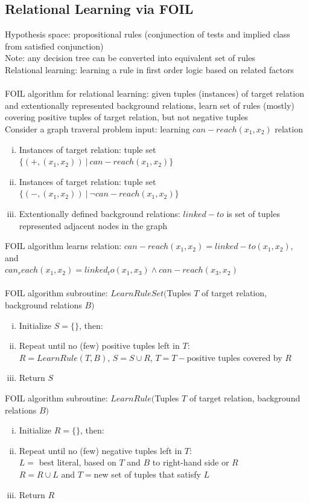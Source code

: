\documentclass{article}
\begin{document}
		\subsection{Relational Learning via FOIL}
			Hypothesis space: propositional rules (conjunection of tests and implied class from satisfied conjunction) \\
			Note: any decision tree can be converted into equivalent set of rules \\
			Relational learning: learning a rule in first order logic based on related factors \\
			\\
			FOIL algorithm for relational learning: given tuples (instances) of target relation and extentionally represented background relations, learn set of rules (mostly) covering positive tuples of target relation, but not negative tuples \\
			Consider a graph traveral problem input: learning $can-reach(x_1, x_2)$ relation
			\begin{enumerate}[(i)]
				\item Instances of target relation: tuple set $\{(+, (x_1, x_2))\:|\:can-reach(x_1, x_2)\}$
				\item Instances of target relation: tuple set $\{(-, (x_1, x_2))\:|\:\neg can-reach(x_1, x_2)\}$
				\item Extentionally defined background relations: $linked-to$ is set of tuples represented adjacent nodes in the graph
				\end{enumerate}
			FOIL algorithm learns relation: $can-reach(x_1, x_2) = linked-to(x_1, x_2)$, and \\
			$can_reach(x_1, x_2) = linked_to(x_1, x_3) \land can-reach(x_3, x_2)$ \\
			\\
			FOIL algorithm subroutine: $LearnRuleSet($Tuples $T$ of target relation, background relations $B)$
			\begin{enumerate}[(i)]
				\item Initialize $S = \{\}$, then:
				\item Repeat until no (few) positive tuples left in $T$: \\
				$R = LearnRule(T, B)$, $S = S \cup R$, $T = T - $positive tuples covered by $R$
				\item Return $S$
				\end{enumerate}
			FOIL algorithm subroutine: $LearnRule($Tuples $T$ of target relation, background relations $B)$
			\begin{enumerate}[(i)]
				\item Initialize $R = \{\}$, then:
				\item Repeat until no (few) negative tuples left in $T$: \\
				$L =$ best literal, based on $T$ and $B$ to right-hand side or $R$ \\
				$R = R \cup L$ and $T = $new set of tuples that satisfy $L$
				\item Return $R$
				\end{enumerate}
\end{document}
